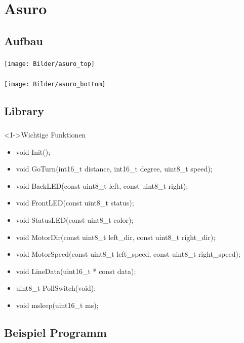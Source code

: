 \section{Asuro}
\subsection{Aufbau}
\begin{frame}[c]
	\frametitle{\currentsection}
	\framesubtitle{\currentsubsection}
	\texttt{[image: Bilder/asuro\_top]}
\end{frame}
\begin{frame}[c]
	\frametitle{\currentsection}
	\framesubtitle{\currentsubsection}
	\texttt{[image: Bilder/asuro\_bottom]}
\end{frame}


\subsection{Library}
\begin{frame}[c]
	\frametitle{\currentsection}
	\framesubtitle{\currentsubsection}
	\begin{block}<1->{Wichtige Funktionen}
		\begin{itemize}
			\item void Init();
			\item void GoTurn(int16\_t distance, int16\_t degree, uint8\_t speed);
			\item void BackLED(const uint8\_t left, const uint8\_t right);
			\item void FrontLED(const uint8\_t status);
			\item void StatusLED(const uint8\_t color);
			\item void MotorDir(const uint8\_t left\_dir, const uint8\_t right\_dir);
			\item void MotorSpeed(const uint8\_t left\_speed, const uint8\_t right\_speed);
			\item void LineData(uint16\_t * const data);
			\item uint8\_t PollSwitch(void);
			\item void msleep(uint16\_t ms);
		\end{itemize}
	\end{block}
\end{frame}


\subsection{Beispiel Programm}
\begin{frame}[c]
	\frametitle{\currentsection}
	\framesubtitle{\currentsubsection}
	
\end{frame}